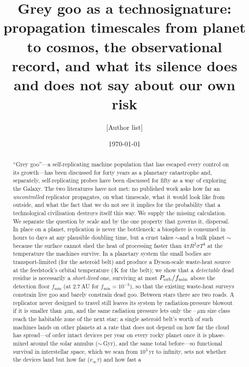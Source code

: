 \documentclass[11pt]{article}
\title{Grey goo as a technosignature: propagation timescales from planet to
cosmos, the observational record, and what its silence does and does not say
about our own risk}
\author{[Author list]}
\date{\today}
\newcommand{\um}{\ensuremath{\,\mu\mathrm{m}}\xspace}
\begin{document}
\maketitle

\begin{abstract}
``Grey goo''---a self-replicating machine population that has escaped every
control on its growth---has been discussed for forty years as a planetary
catastrophe and, separately, self-replicating probes have been discussed for
fifty as a way of exploring the Galaxy.  The two literatures have not met: no
published work asks how far an \emph{uncontrolled} replicator propagates, on
what timescale, what it would look like from outside, and what the fact that we
do not see it implies for the probability that a technological civilisation
destroys itself this way.  We supply the missing calculation.  We separate the
question by scale and by the one property that governs it, dispersal.  In place
on a planet, replication is never the bottleneck: a biosphere is consumed in
hours to days at any plausible doubling time, but a crust takes
$\sim$\CrustGovTime and a bulk planet $\sim$\BulkGovTime because the surface
cannot shed the heat of processing faster than $4\pi R^2\sigma T^4$ at the
temperature the machines survive.  In a planetary system the small bodies are
transport-limited (\BeltConvTime for the asteroid belt) and produce a
Dyson-scale waste-heat source at the feedstock's orbital temperature
(\BeltTempK\,K for the belt); we show that a \emph{detectable} dead residue is
necessarily a \emph{short-lived} one, surviving at most $P_{\rm orb}/f_{\min}$
above the detection floor $f_{\min}$ (\MaxVisibleResidueMilli at 2.7\,AU for
$f_{\min}=10^{-3}$), so that the existing waste-heat surveys constrain live
goo and barely constrain dead goo.  Between stars there are two roads.  A
replicator never designed to travel still leaves its system by
radiation-pressure blowout if it is smaller than \BlowoutRadiusUm\um, and the
same radiation pressure lets only the \WindowLoUm--\WindowHiUm\um size class
reach the habitable zone of the next star; a single asteroid belt's worth of
such machines lands on other planets at a rate that does not depend on how far
the cloud has spread---of order \BeltArrivalsUnsurvived intact devices per
year on every rocky planet once it is phase-mixed around the solar annulus
($\sim$\AnnulusFillGyr\,Gyr), and the same total before---so functional
survival in interstellar space, which we scan from $10^{3}$\,yr to infinity,
sets not whether the devices land but how far ($v_\infty\tau$) and how fast a

\end{abstract}
\end{document}
